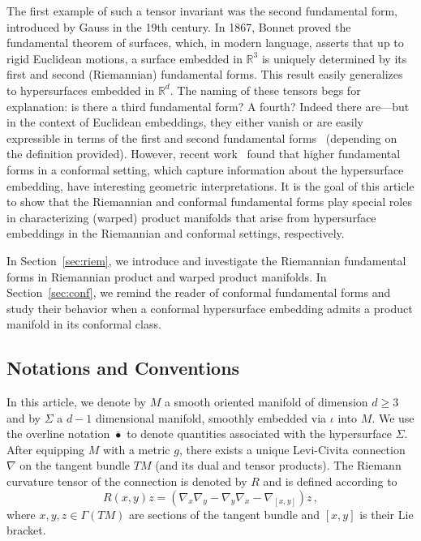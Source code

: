 \documentclass[a4paper,10.9pt]{amsart}
\theoremstyle{definition}
\theoremstyle{remark}
\numberwithin{equation}{section}
\renewcommand{\=}{\stackrel \Sigma =}
\renewcommand\geq{\geqslant}
\begin{document}
The first example of such a tensor invariant was the second fundamental form, introduced by Gauss in the 19th century. In 1867, Bonnet proved the fundamental theorem of surfaces, which, in modern language, asserts that up to rigid Euclidean motions, a surface embedded in $\mathbb{R}^3$ is uniquely determined by its first and second (Riemannian) fundamental forms. This result easily generalizes to hypersurfaces embedded in $\mathbb{R}^d$. The naming of these tensors begs for explanation: is there a third fundamental form? A fourth? Indeed there are---but in the context of Euclidean embeddings, they either vanish or are easily expressible in terms of the first and second fundamental forms~\cite[Volume 3]{Spivak} (depending on the definition provided). However, recent work~\cite{BGW1} found that higher fundamental forms in a conformal setting, which capture information about the hypersurface embedding, have interesting geometric interpretations. It is the goal of this article to show that the Riemannian and conformal fundamental forms play special roles in characterizing (warped) product manifolds that arise from hypersurface embeddings in the Riemannian and conformal settings, respectively.

In Section~\ref{sec:riem}, we introduce and investigate the Riemannian fundamental forms in Riemannian product and warped product manifolds. In Section~\ref{sec:conf}, we remind the reader of conformal fundamental forms and study their behavior when a conformal hypersurface embedding admits a product manifold in its conformal class.

\subsection{Notations and Conventions}

In this article, we denote by $M$ a smooth oriented manifold of dimension $d \geq 3$ and by $\Sigma$ a $d-1$ dimensional manifold, smoothly embedded via $\iota$ into $M$. We use the overline notation $\bar{\bullet}$ to denote quantities associated with the hypersurface $\Sigma$. After equipping $M$ with a metric $g$, there exists a unique Levi-Civita connection $\nabla$ on the tangent bundle $TM$ (and its dual and tensor products). The Riemann curvature tensor of the connection is denoted by $R$ and is defined according to
$$R(x,y)z = (\nabla_x \nabla_y - \nabla_y \nabla_x - \nabla_{[x,y]}) z\,,$$
where $x,y,z \in \Gamma(TM)$ are sections of the tangent bundle and $[x,y]$ is their Lie bracket.
\end{document}
